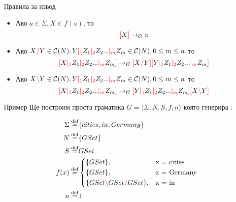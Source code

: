 \documentclass[9pt]{beamer}
\begin{document}
  \begin{frame}{Правила за извод}
    \begin{itemize}
        \item Ако $ a \in \Sigma, X \in f(a) $, то \[ \textcolor{red}{[} X \textcolor{red}{]} \rightarrow_G a \]
        \item Ако $ X \textcolor{red}{/} Y \in \mathcal{C}( N ), Y \textcolor{red}{|_{1}} Z_1 \textcolor{red}{|_{2}} Z_2 ... \textcolor{red}{|_{m}} Z_m \in \mathcal{C}( N ), 0 \leq m \leq n $
            то \[ \textcolor{red}{[} X \textcolor{red}{|_{1}} Z_1 \textcolor{red}{|_{2}} Z_2 ... \textcolor{red}{|_{m}} Z_m \textcolor{red}{]} \rightarrow_G \textcolor{red}{[} X \textcolor{red}{/} Y \textcolor{red}{]} \textcolor{red}{[} Y \textcolor{red}{|_{1}} Z_1 \textcolor{red}{|_{2}} Z_2 ... \textcolor{red}{|_{m}} Z_m \textcolor{red}{]} \]
        \item Ако $ X \textcolor{red}{\backslash} Y \in \mathcal{C}( N ), Y \textcolor{red}{|_{1}} Z_1 \textcolor{red}{|_{2}} Z_2 ... \textcolor{red}{|_{m}} Z_m \in \mathcal{C}( N ), 0 \leq m \leq n $
            то \[ \textcolor{red}{[} X \textcolor{red}{|_{1}} Z_1 \textcolor{red}{|_{2}} Z_2 ... \textcolor{red}{|_{m}} Z_m \textcolor{red}{]} \rightarrow_G \textcolor{red}{[} Y \textcolor{red}{|_{1}} Z_1 \textcolor{red}{|_{2}} Z_2 ... \textcolor{red}{|_{m}} Z_m \textcolor{red}{]} \textcolor{red}{[} X \textcolor{red}{\backslash} Y \textcolor{red}{]} \]
    \end{itemize}
  \end{frame}

  \begin{frame}{Пример}
    Ще построим проста граматика $G = \langle \Sigma, N, S, f, n \rangle$
    която генерира :

    \begin{align*}
        \Sigma \defeq& \{ cities, in, Germany \} \\
        N \defeq& \{ GSet \} \\
        S \defeq& GSet \\
        f(x) \defeq&
            \begin{cases*}
                \{ GSet \},& x = cities \\
                \{ GSet \},& x = Germany \\
                \{ GSet \lc GSet \rc GSet \},& x = in \\
            \end{cases*} \\
        n \defeq& 1 \\
    \end{align*}
  \end{frame}
\end{document}
